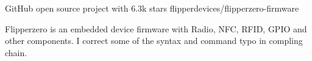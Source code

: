 

\begin{cventries}


  \cventry
    {GitHub open source project with 6.3k stars} %
    {flipperdevices/flipperzero-firmware} %
    {} %
    {} %
    {
      \begin{cvitems} %
        \item {Flipperzero is an embedded device firmware with Radio, NFC, RFID, GPIO and other components. I correct some of the syntax and command typo in compling chain.}
      \end{cvitems}
    }

\end{cventries}
